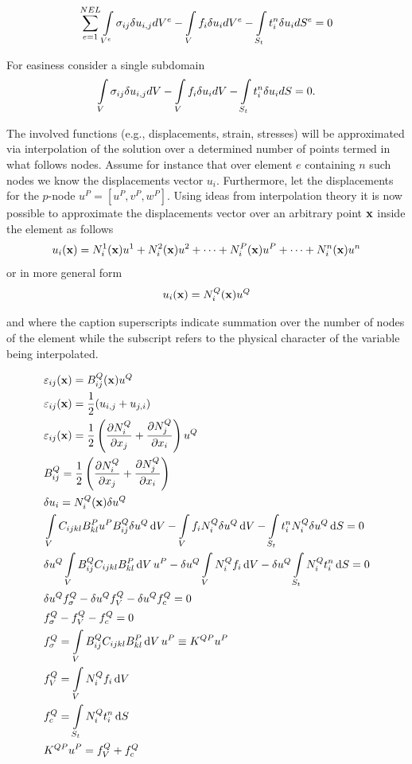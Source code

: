 \begin{equation}\label{pvw_dis}
\sum_{e=1}^{NEL} \int\limits_{V^e} \sigma_{ij} \delta u_{i,j} d{V^e} - \int\limits_V f_i \delta u_i d{V^e} - \int\limits_{S_t} t_i^n \delta u_id{S^e} = 0 
\end{equation}

For easiness consider a single subdomain
\begin{equation} \label{pvw_sing}
\int\limits_V \sigma_{ij} \delta u_{i,j} dV - \int\limits_V f_i\delta u_idV - \int\limits_{S_t} t_i^n \delta u_i dS = 0.
\end{equation}

The involved functions (e.g., displacements, strain, stresses) will be approximated via interpolation of the solution over a determined number of points termed in what follows nodes. Assume for instance that over element $e$ containing $n$ such nodes we know the displacements vector $u_i$. Furthermore, let the displacements for the $p$-node $u^P=[u^P, v^P, w^P]$. Using ideas from interpolation theory it is now possible to approximate the displacements vector over an arbitrary point $\vb{x}$ inside the element as follows
\[u_i(\vb x) = N_i^1(\vb x)u^1 + N_i^2(\vb x)u^2 + \cdots + N_i^P(\vb x)u^P + \cdots + N_i^n(\vb x)u^n\]
or in more general form
\begin{equation} \label{bas_interpol}
{u_i}(\vb x) = N_i^Q(\vb x){u^Q}
\end{equation}

and where the caption superscripts indicate summation over the number of nodes of the element while the subscript refers to the physical character of the variable being interpolated.

\begin{align*}
&\varepsilon_{ij}(\vb x) = B_{ij}^Q(\vb x){u^Q}\\
&\varepsilon_{ij}(\vb x) = \frac{1}{2}( u_{i,j} + u_{j,i} )\\
&\varepsilon_{ij}(\vb x) = \frac{1}{2}\left(\pdv{N_i^Q}{x_j} + \pdv{N_j^Q}{x_i} \right){u^Q}\\
&B_{ij}^Q = \frac{1}{2}\left(\pdv{N_i^Q}{x_j} + \pdv{N_j^Q}{x_i} \right)\\
&\delta {u_i} = N_i^Q(\vb x)\delta {u^Q}\\
&\int\limits_V C_{ijkl} B_{kl}^P u^P B_{ij}^Q\delta u^Q \dd{V} - \int\limits_V f_i N_i^Q\delta {u^Q}\dd{V}  - \int\limits_{S_t} t_i^n N_i^Q\delta {u^Q} \dd{S} = 0\\
&\delta {u^Q}\int\limits_V B_{ij}^Q C_{ijkl} B_{kl}^P\dd{V}{u^P} - \delta {u^Q}\int\limits_V N_i^Q{f_i}\dd{V}  - \delta {u^Q}\int\limits_{S_t} N_i^Qt_i^n\dd{S} = 0 \\
&\delta u^Q f_\sigma ^Q - \delta {u^Q}f_V^Q - \delta u^Q f_c^Q = 0\\
&f_\sigma ^Q - f_V^Q - f_c^Q = 0\\
&f_\sigma ^Q = \int\limits_V B_{ij}^Q C_{ijkl} B_{kl}^P\dd{V} u^P \equiv K^{QP} u^P\\
&f_V^Q = \int\limits_V N_i^Q f_i\dd{V} \\
&f_c^Q = \int\limits_{S_t} N_i^Qt_i^n \dd{S} \\
&K^{QP} u^P = f_V^Q + f_c^Q
\end{align*}

